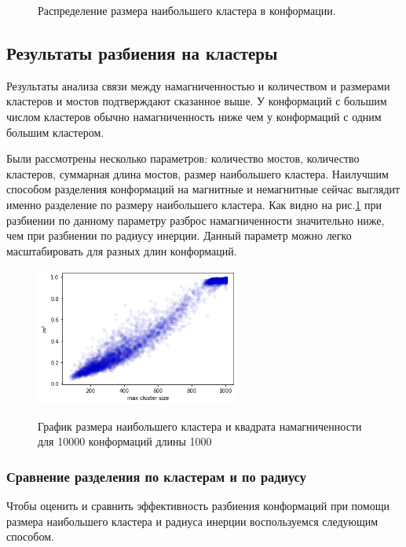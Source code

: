\begin{figure}[H]
\begin{subfigure}[t]{0.3\textwidth}
	\end{subfigure}
	\caption{Распределение размера наибольшего кластера в конформации.}
\end{figure}


\subsection{Результаты разбиения на кластеры}
Результаты анализа связи между намагниченностью и количеством и размерами кластеров и мостов подтверждают сказанное выше. У конформаций с большим числом кластеров обычно намагниченность ниже чем у конформаций с одним большим кластером. 

Были рассмотрены несколько параметров: количество мостов, количество кластеров, суммарная длина мостов, размер наибольшего кластера. Наилучшим способом разделения конформаций на магнитные и немагнитные сейчас выглядит именно разделение по размеру наибольшего кластера. Как видно на рис.\ref{fig:mag_from_max_cluster} при разбиении по данному параметру разброс намагниченности значительно ниже, чем при разбиении по радиусу инерции. Данный параметр можно легко масштабировать для разных длин конформаций.

\begin{figure}[ht]
	\centering
	\caption{График размера наибольшего кластера и квадрата намагниченности для 10000 конформаций длины 1000}
	\includegraphics[width=0.6\textwidth]{../images/mag_from_cluster_size.png} 
	\label{fig:mag_from_max_cluster}
\end{figure}

\subsubsection*{Сравнение разделения по кластерам и по радиусу}
Чтобы оценить и сравнить эффективность разбиения конформаций при помощи размера наибольшего кластера и радиуса инерции воспользуемся следующим способом.


